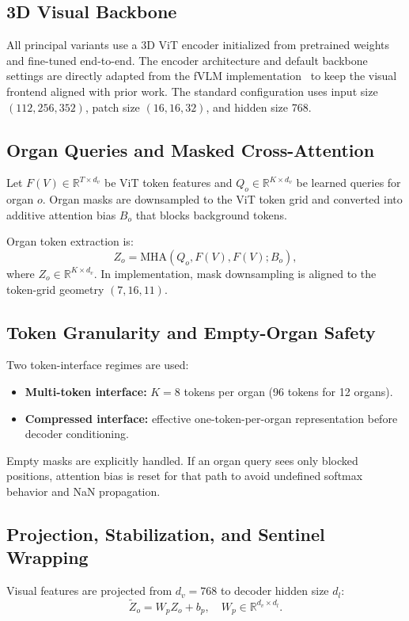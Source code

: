 \subsection{3D Visual Backbone}
All principal variants use a 3D ViT encoder initialized from pretrained weights and fine-tuned end-to-end. The encoder architecture and default backbone settings are directly adapted from the fVLM implementation~\cite{shui2025fvlm} to keep the visual frontend aligned with prior work. The standard configuration uses input size $(112,256,352)$, patch size $(16,16,32)$, and hidden size 768.

\subsection{Organ Queries and Masked Cross-Attention}
Let $F(V) \in \mathbb{R}^{T \times d_v}$ be ViT token features and $Q_o \in \mathbb{R}^{K \times d_v}$ be learned queries for organ $o$. Organ masks are downsampled to the ViT token grid and converted into additive attention bias $B_o$ that blocks background tokens.

Organ token extraction is:
\begin{equation}
Z_o = \mathrm{MHA}(Q_o, F(V), F(V); B_o),
\end{equation}
where $Z_o \in \mathbb{R}^{K \times d_v}$. In implementation, mask downsampling is aligned to the token-grid geometry $(7,16,11)$.

\subsection{Token Granularity and Empty-Organ Safety}
Two token-interface regimes are used:
\begin{itemize}
    \item \textbf{Multi-token interface:} $K=8$ tokens per organ (96 tokens for 12 organs).
    \item \textbf{Compressed interface:} effective one-token-per-organ representation before decoder conditioning.
\end{itemize}

Empty masks are explicitly handled. If an organ query sees only blocked positions, attention bias is reset for that path to avoid undefined softmax behavior and NaN propagation.

\subsection{Projection, Stabilization, and Sentinel Wrapping}
Visual features are projected from $d_v=768$ to decoder hidden size $d_l$:
\begin{equation}
\tilde{Z}_o = W_p Z_o + b_p, \quad W_p \in \mathbb{R}^{d_v \times d_l}.
\end{equation}

